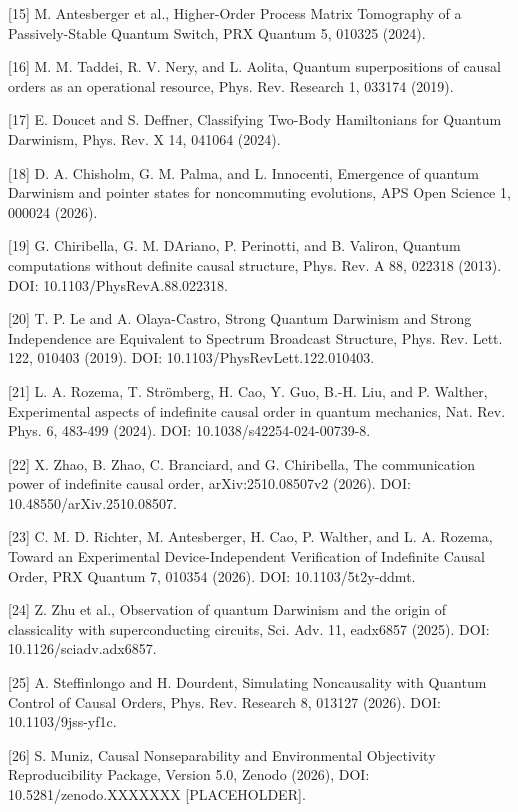 \documentclass[
]{article}
\begin{document}
{[}15{]} M. Antesberger et al., Higher-Order Process Matrix Tomography
of a Passively-Stable Quantum Switch, PRX Quantum 5, 010325 (2024).

{[}16{]} M. M. Taddei, R. V. Nery, and L. Aolita, Quantum superpositions
of causal orders as an operational resource, Phys. Rev. Research 1,
033174 (2019).

{[}17{]} E. Doucet and S. Deffner, Classifying Two-Body Hamiltonians for
Quantum Darwinism, Phys. Rev. X 14, 041064 (2024).

{[}18{]} D. A. Chisholm, G. M. Palma, and L. Innocenti, Emergence of
quantum Darwinism and pointer states for noncommuting evolutions, APS
Open Science 1, 000024 (2026).

{[}19{]} G. Chiribella, G. M. D\textquotesingle Ariano, P. Perinotti,
and B. Valiron, Quantum computations without definite causal structure,
Phys. Rev. A 88, 022318 (2013). DOI: 10.1103/PhysRevA.88.022318.

{[}20{]} T. P. Le and A. Olaya-Castro, Strong Quantum Darwinism and
Strong Independence are Equivalent to Spectrum Broadcast Structure,
Phys. Rev. Lett. 122, 010403 (2019). DOI:
10.1103/PhysRevLett.122.010403.

{[}21{]} L. A. Rozema, T. Strömberg, H. Cao, Y. Guo, B.-H. Liu, and P.
Walther, Experimental aspects of indefinite causal order in quantum
mechanics, Nat. Rev. Phys. 6, 483-499 (2024). DOI:
10.1038/s42254-024-00739-8.

{[}22{]} X. Zhao, B. Zhao, C. Branciard, and G. Chiribella, The
communication power of indefinite causal order, arXiv:2510.08507v2
(2026). DOI: 10.48550/arXiv.2510.08507.

{[}23{]} C. M. D. Richter, M. Antesberger, H. Cao, P. Walther, and L. A.
Rozema, Toward an Experimental Device-Independent Verification of
Indefinite Causal Order, PRX Quantum 7, 010354 (2026). DOI:
10.1103/5t2y-ddmt.

{[}24{]} Z. Zhu et al., Observation of quantum Darwinism and the origin
of classicality with superconducting circuits, Sci. Adv. 11, eadx6857
(2025). DOI: 10.1126/sciadv.adx6857.

{[}25{]} A. Steffinlongo and H. Dourdent, Simulating Noncausality with
Quantum Control of Causal Orders, Phys. Rev. Research 8, 013127 (2026).
DOI: 10.1103/9jss-yf1c.

{[}26{]} S. Muniz, Causal Nonseparability and Environmental Objectivity
Reproducibility Package, Version 5.0, Zenodo (2026), DOI:
10.5281/zenodo.XXXXXXX {[}PLACEHOLDER{]}.
\end{document}
